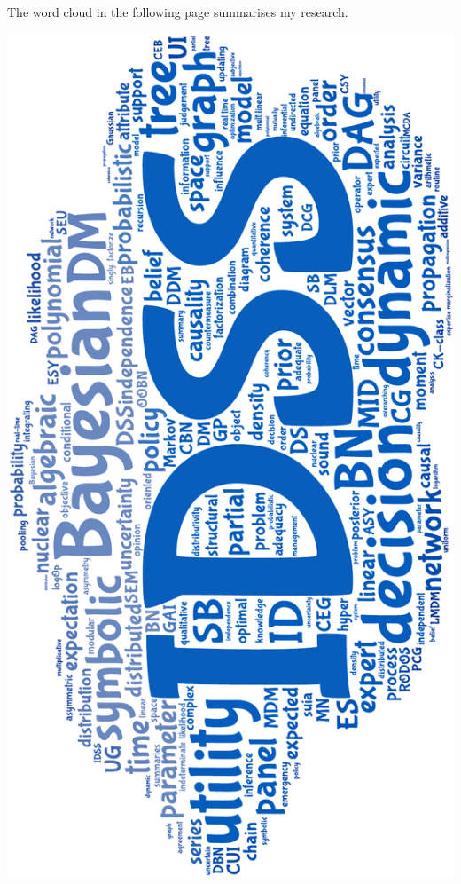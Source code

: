 \documentclass[11pt, oneside]{Thesis} %
\begin{document}
The word cloud in the following page summarises my research. 
\clearpage
\begin{center}
\includegraphics[scale=0.68]{cloud.pdf}
\end{center}
\clearpage
\end{document}
